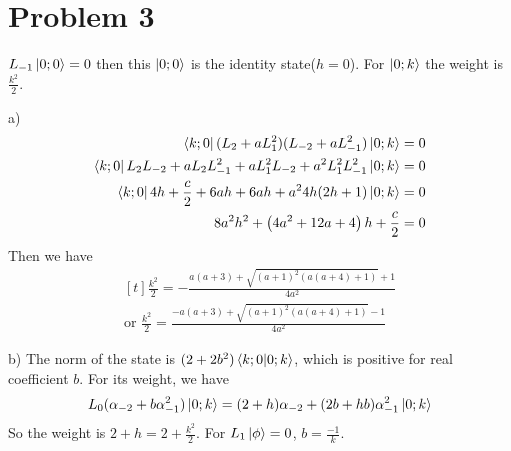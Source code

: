\documentclass[12pt]{article}
\begin{document}
\section{Problem 3}
$L_{-1}\ket{0;0}=0$ then this $\ket{0;0}$ is the identity state($h=0$). For $\ket{0;k}$ the weight is $\frac{k^2}{2}$.
\begin{paragraph}{a)}
\begin{equation}
\begin{aligned}[t]
\bra{k;0}(L_{2}+aL_{1}^2)(L_{-2}+aL_{-1}^2)\ket{0;k}=0\\
\bra{k;0}L_{2}L_{-2}+aL_2 L_{-1}^2+aL_1^2 L_{-2}+a^2 L_1^2 L_{-1}^2\ket{0;k}=0\\
\bra{k;0}4h+\frac{c}{2}+6ah+6ah+a^2 4h(2h+1)\ket{0;k}=0\\
8 a^2 h^2+\left(4 a^2+12 a+4\right) h+\frac{c}{2}=0
\end{aligned}
\end{equation}
Then we have 
\begin{equation}
\begin{aligned}[t]
\frac{k^2}{2}= -\frac{a (a+3)+\sqrt{(a+1)^2 (a (a+4)+1)}+1}{4 a^2}\\
\text{or  }\frac{k^2}{2}=\frac{-a (a+3)+\sqrt{(a+1)^2 (a (a+4)+1)}-1}{4 a^2}
\end{aligned}
\end{equation}
\end{paragraph}
\begin{paragraph}{b)}
The norm of the state is $(2+2b^2)\bra{k;0}\ket{0;k}$, which is positive for real coefficient $b$. For its weight, we have
\begin{equation}
\begin{aligned}[t]
L_0(\alpha_{-2}+b\alpha_{-1}^2)\ket{0;k}=(2+h)\alpha_{-2}+(2b+hb)\alpha_{-1}^2\ket{0;k}
\end{aligned}
\end{equation}
So the weight is $2+h=2+\frac{k^2}{2}$. For $L_1\ket{\phi}=0$, $b=\frac{-1}{k}$.
\end{paragraph}
\end{document}
